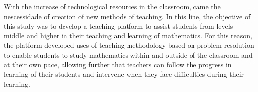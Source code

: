 With the increase of technological resources in the classroom, came the nescessidade of creation of new methods of teaching. In this line, the objective of this study was to develop a teaching platform to assist students from levels middle and higher in their teaching and learning of mathematics. For this reason, the platform developed uses of teaching methodology based on problem resolution to enable students to study mathematics within and outside of the classroom and at their own pace, allowing further that teachers can follow the progress in learning of their students and intervene when they face difficulties during their learning.

